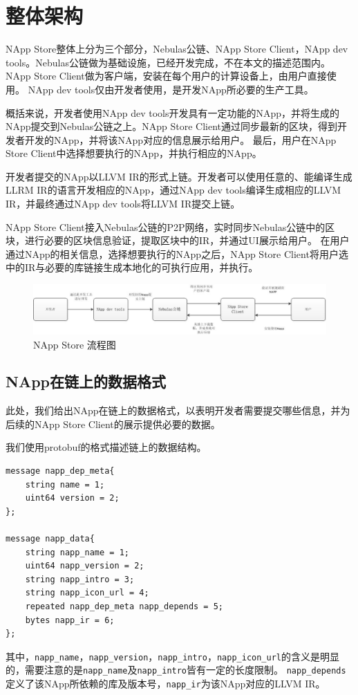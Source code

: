 \section{整体架构}

NApp Store整体上分为三个部分，Nebulas公链、NApp Store Client，NApp dev tools。Nebulas公链做为基础设施，已经开发完成，不在本文的描述范围内。NApp Store Client做为客户端，安装在每个用户的计算设备上，由用户直接使用。
NApp dev tools仅由开发者使用，是开发NApp所必要的生产工具。

概括来说，开发者使用NApp dev tools开发具有一定功能的NApp，并将生成的NApp提交到Nebulas公链之上。NApp Store Client通过同步最新的区块，得到开发者开发的NApp，并将该NApp对应的信息展示给用户。
最后，用户在NApp Store Client中选择想要执行的NApp，并执行相应的NApp。

开发者提交的NApp以LLVM IR的形式上链。开发者可以使用任意的、能编译生成LLRM IR的语言开发相应的NApp，通过NApp dev tools编译生成相应的LLVM IR，并最终通过NApp dev tools将LLVM IR提交上链。

NApp Store Client接入Nebulas公链的P2P网络，实时同步Nebulas公链中的区块，进行必要的区块信息验证，提取区块中的IR，并通过UI展示给用户。
在用户通过NApp的相关信息，选择想要执行的NApp之后，NApp Store Client将用户选中的IR与必要的库链接生成本地化的可执行应用，并执行。

\begin{figure}[ht!]
\centering
  \includegraphics[width=.9\textwidth]{flow.jpg}
\caption{NApp Store 流程图}
\end{figure}

\subsection{NApp在链上的数据格式}
此处，我们给出NApp在链上的数据格式，以表明开发者需要提交哪些信息，并为后续的NApp Store Client的展示提供必要的数据。

我们使用protobuf的格式描述链上的数据结构。
\begin{verbatim}
message napp_dep_meta{
    string name = 1;
    uint64 version = 2;
};

message napp_data{
    string napp_name = 1;
    uint64 napp_version = 2;
    string napp_intro = 3;
    string napp_icon_url = 4;
    repeated napp_dep_meta napp_depends = 5;
    bytes napp_ir = 6;
};

\end{verbatim}
\noindent 其中，\texttt{napp\_name}，\texttt{napp\_version}，\texttt{napp\_intro}，\texttt{napp\_icon\_url}的含义是明显的，需要注意的是\texttt{napp\_name}及\texttt{napp\_intro}皆有一定的长度限制。
\texttt{napp\_depends}定义了该NApp所依赖的库及版本号，\texttt{napp\_ir}为该NApp对应的LLVM IR。

